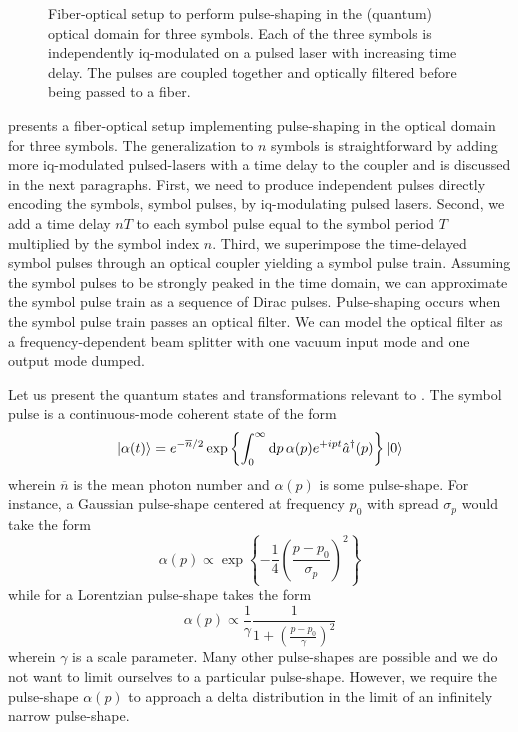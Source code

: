 \begin{figure}[htb]
	\centering
    
    \caption{Fiber-optical setup to perform pulse-shaping in the (quantum) optical domain for three symbols. Each of the three symbols is independently \gls{iq}-modulated on a pulsed laser with increasing time delay. The pulses are coupled together and optically filtered before being passed to a fiber.}\label{fig:quantum_pulse_shaping}
\end{figure}
 presents a fiber-optical setup implementing pulse-shaping in the optical domain for three symbols.
The generalization to $n$ symbols is straightforward by adding more \gls{iq}-modulated pulsed-lasers with a time delay to the coupler and is discussed in the next paragraphs.
First, we need to produce independent pulses directly encoding the symbols, symbol pulses, by \gls{iq}-modulating pulsed lasers.
Second, we add a time delay $nT$ to each symbol pulse equal to the symbol period $T$ multiplied by the symbol index $n$.
Third, we superimpose the time-delayed symbol pulses through an optical coupler yielding a symbol pulse train.
Assuming the symbol pulses to be strongly peaked in the time domain, we can approximate the symbol pulse train as a sequence of Dirac pulses.
Pulse-shaping occurs when the symbol pulse train passes an optical filter.
We can model the optical filter as a frequency-dependent beam splitter with one vacuum input mode and one output mode dumped.

Let us present the quantum states and transformations relevant to .
The symbol pulse is a continuous-mode coherent state of the form
\begin{equation}
	\ket{\alpha(t)}
	=
	e^{-\overline{n}/2}
	\exp\left\{
		\int_0^\infty\dd{p}
		\alpha(p)
		e^{+ipt}
		\hat{a}^\dagger(p)
	\right\}
	\ket{0}
\end{equation}
wherein $\overline{n}$ is the mean photon number and $\alpha(p)$ is some pulse-shape.
For instance, a Gaussian pulse-shape centered at frequency $p_0$ with spread $\sigma_p$ would take the form
\begin{equation}
	\alpha(p)
	\propto
	\exp\left\{
		-\frac{1}{4}\left(\frac{p-p_0}{\sigma_p}\right)^2
	\right\}
\end{equation}
while for a Lorentzian pulse-shape takes the form
\begin{equation}
	\alpha(p)
	\propto
	\frac{1}{\gamma}
	\frac{1}{1+\left(\frac{p-p_0}{\gamma}\right)^2}
\end{equation}
wherein $\gamma$ is a scale parameter.
Many other pulse-shapes are possible and we do not want to limit ourselves to a particular pulse-shape.
However, we require the pulse-shape $\alpha(p)$ to approach a delta distribution in the limit of an infinitely narrow pulse-shape.

